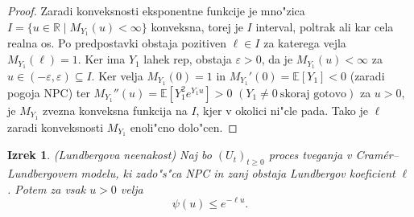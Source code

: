 \documentclass[12pt, a4paper, reqno]{amsart}
\theoremstyle{definition}
\theoremstyle{plain}
\newtheorem{izrek}[definicija]{Izrek}
\newcommand{\R}{\mathbb{R}}
\newcommand{\E}{\mathbb{E}}
\newcommand{\1}{\mathds{1}}
\begin{document}
            \begin{proof}
                Zaradi konveksnosti eksponentne funkcije je mno"zica $I = \{u\in\R \mid M_{Y_1}(u) < \infty\}$ konveksna, 
                torej je $I$ interval, poltrak ali kar cela realna os. Po predpostavki obstaja pozitiven $\ell \in I$ za 
                katerega vejla $M_{Y_1}(\ell) = 1$.
                Ker ima $Y_1$ lahek rep, obstaja $\varepsilon > 0$, da je $M_{Y_1}(u) < \infty$ za $u\in(-\varepsilon, \varepsilon)\subseteq I$.
                Ker velja $M_{Y_1}(0) = 1$ in $M_{Y_1}'(0) = \E\left[Y_1\right] < 0$ (zaradi pogoja NPC) ter
                $M_{Y_1}''(u) = \E\left[Y_1^2e^{Y_1u}\right] > 0$ $(Y_1 \neq 0 \ \text{skoraj gotovo})$ za 
                $u>0$, je $M_{Y_1}$ zvezna konveksna funkcija na $I$, kjer 
                v okolici ni"cle pada. Tako je $\ell$ zaradi konveksnosti $M_{Y_1}$ enoli"cno dolo"cen.
            \end{proof}

            \begin{izrek}(Lundbergova neenakost)
                Naj bo $(U_t)_{t\geq0}$ proces tveganja v Cramér--Lundbergovem modelu, ki zado"s"ca NPC in 
                 zanj obstaja Lundbergov koeficient $\ell$. Potem za vsak $u>0$ velja
                \begin{equation*}
                    \psi(u) \leq e^{-\ell u}.
                \end{equation*}
                \label{izr:LundbergovaNeenakost}
            \end{izrek}
\end{document}
